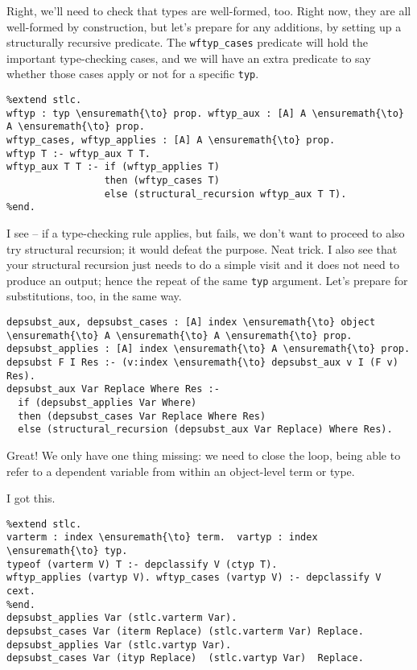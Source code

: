 \heroADVISOR{} Right, we'll need to check that types are well-formed, too.
Right now, they are all well-formed by construction, but let's prepare
for any additions, by setting up a structurally recursive predicate. The
\texttt{wftyp\_cases} predicate will hold the important type-checking
cases, and we will have an extra predicate to say whether those cases
apply or not for a specific \texttt{typ}.

\begin{verbatim}
%extend stlc.
wftyp : typ \ensuremath{\to} prop. wftyp_aux : [A] A \ensuremath{\to} A \ensuremath{\to} prop.
wftyp_cases, wftyp_applies : [A] A \ensuremath{\to} prop.
wftyp T :- wftyp_aux T T.
wftyp_aux T T :- if (wftyp_applies T)
                 then (wftyp_cases T)
                 else (structural_recursion wftyp_aux T T).
%end.
\end{verbatim}

\heroSTUDENT{} I see -- if a type-checking rule applies, but fails, we don't
want to proceed to also try structural recursion; it would defeat the
purpose. Neat trick. I also see that your structural recursion just
needs to do a simple visit and it does not need to produce an output;
hence the repeat of the same \texttt{typ} argument. Let's prepare for
substitutions, too, in the same way.

\begin{verbatim}
depsubst_aux, depsubst_cases : [A] index \ensuremath{\to} object \ensuremath{\to} A \ensuremath{\to} A \ensuremath{\to} prop.
depsubst_applies : [A] index \ensuremath{\to} A \ensuremath{\to} prop.
depsubst F I Res :- (v:index \ensuremath{\to} depsubst_aux v I (F v) Res).
depsubst_aux Var Replace Where Res :-
  if (depsubst_applies Var Where)
  then (depsubst_cases Var Replace Where Res)
  else (structural_recursion (depsubst_aux Var Replace) Where Res).
\end{verbatim}

\heroADVISOR{} Great! We only have one thing missing: we need to close the
loop, being able to refer to a dependent variable from within an
object-level term or type.

\heroSTUDENT{} I got this.

\begin{verbatim}
%extend stlc.
varterm : index \ensuremath{\to} term.  vartyp : index \ensuremath{\to} typ.
typeof (varterm V) T :- depclassify V (ctyp T).
wftyp_applies (vartyp V). wftyp_cases (vartyp V) :- depclassify V cext.
%end.
depsubst_applies Var (stlc.varterm Var).
depsubst_cases Var (iterm Replace) (stlc.varterm Var) Replace.
depsubst_applies Var (stlc.vartyp Var).
depsubst_cases Var (ityp Replace)  (stlc.vartyp Var)  Replace.
\end{verbatim}


